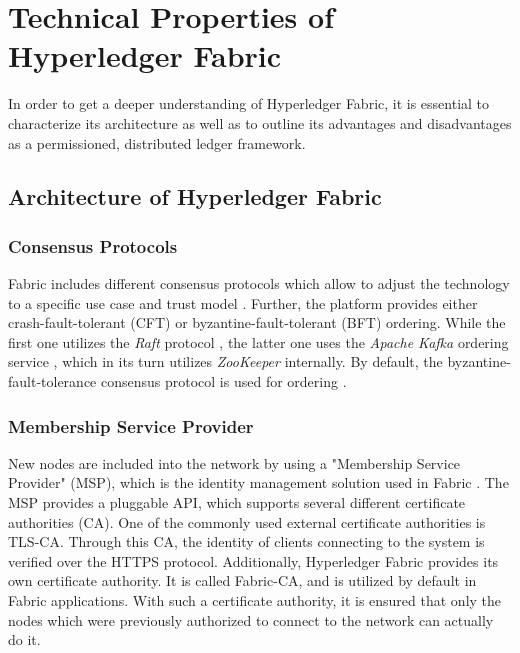 \section{Technical Properties of Hyperledger Fabric}
In order to get a deeper understanding of Hyperledger Fabric, it is essential to characterize its architecture as well as to outline its advantages and disadvantages as a permissioned, distributed ledger framework. 

\subsection{Architecture of Hyperledger Fabric}

\subsubsection{Consensus Protocols} \label{consensus}
Fabric includes different consensus protocols which allow to adjust the technology to a specific use case and trust model \cite[p. 23]{Blummer2018}. Further, the platform provides either crash-fault-tolerant (CFT) or byzantine-fault-tolerant (BFT) \cite{Castro2001} ordering. While the first one utilizes the \textit{Raft} protocol \cite{Ongaro2014}, the latter one uses the \textit{Apache Kafka} ordering service \cite{ApacheSoftwareFoundation2017}, which in its turn utilizes \textit{ZooKeeper} \cite{ApacheSoftwareFoundation} internally. By default, the byzantine-fault-tolerance consensus protocol is used for ordering \cite[p.2]{Cachin2016}. 

\subsubsection{Membership Service Provider}
New nodes are included into the network by using a "Membership Service Provider" (MSP), which is the identity management solution used in Fabric \cite[p. 31]{Matthes2019}. The MSP provides a pluggable API, which supports several different certificate authorities (CA). One of the commonly used external certificate authorities is TLS-CA. Through this CA, the identity of clients connecting to the system is verified over the HTTPS protocol. Additionally, Hyperledger Fabric provides its own certificate authority. It is called Fabric-CA, and is utilized by default in Fabric applications. With such a certificate authority, it is ensured that only the nodes which were previously authorized to connect to the network can actually do it. 

